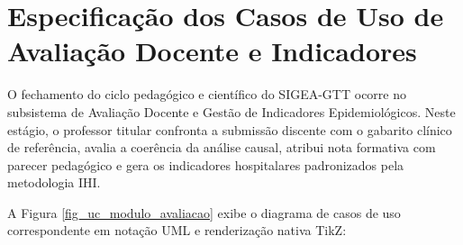\chapter{Especificação dos Casos de Uso de Avaliação Docente e Indicadores}
\label{cap_avaliacao_indicadores}

O fechamento do ciclo pedagógico e científico do SIGEA-GTT ocorre no subsistema de Avaliação Docente e Gestão de Indicadores Epidemiológicos. Neste estágio, o professor titular confronta a submissão discente com o gabarito clínico de referência, avalia a coerência da análise causal, atribui nota formativa com parecer pedagógico e gera os indicadores hospitalares padronizados pela metodologia IHI.

A Figura \ref{fig_uc_modulo_avaliacao} exibe o diagrama de casos de uso correspondente em notação UML e renderização nativa TikZ:

